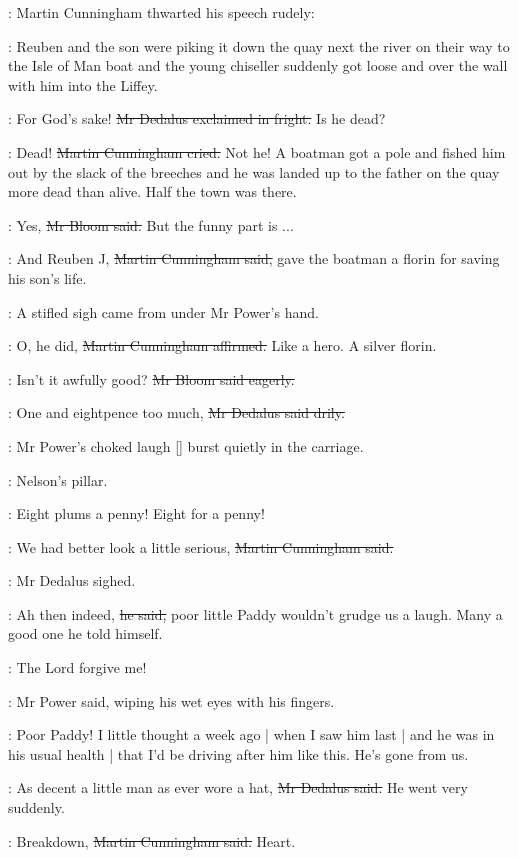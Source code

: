 :
Martin Cunningham thwarted his speech rudely:

\cunningham:
Reuben and the son were piking it down the quay next the river
on their way to the Isle of Man boat
and the young chiseller suddenly got loose
and over the wall with him
into the Liffey.

\simon:
For God's sake!
\sout{Mr Dedalus exclaimed in fright.}
Is he dead?

\cunningham:
Dead!
\sout{Martin Cunningham cried.}
Not he!
A boatman got a pole and fished him out by the slack of the breeches
and he was landed up to the father on the quay
more dead than alive.
Half the town was there.

\Bloom:
Yes,
\sout{Mr Bloom said.}
But the funny part is ...

\cunningham:
And Reuben J,
\sout{Martin Cunningham said,}
gave the boatman a florin for saving his son's life.

:
A stifled sigh came from under Mr Power's hand.

\cunningham:
O, he did,
\sout{Martin Cunningham affirmed.}
Like a hero.
A silver florin.

\Bloom:
Isn't it awfully good?
\sout{Mr Bloom said eagerly.}

\simon:
One and eightpence too much,
\sout{Mr Dedalus said drily.}

:
Mr Power's choked laugh
[]
burst quietly in the carriage.

\BloomInt:
Nelson's pillar.

\woman:
Eight plums a penny!
Eight for a penny!

\cunningham:
We had better look a little serious,
\sout{Martin Cunningham said.}

:
Mr Dedalus sighed.

\simon:
Ah then indeed,
\sout{he said,}
poor little Paddy wouldn't grudge us a laugh.
Many a good one he told himself.

\power:
The Lord forgive me!

:
Mr Power said,
wiping his wet eyes with his fingers.

\power:
Poor Paddy!
I little thought a week ago |
when I saw him last |
and he was in his usual health |
that I'd be driving after him like this.
He's gone from us.

\simon:
As decent a little man as ever wore a hat,
\sout{Mr Dedalus said.}
He went very suddenly.

\cunningham:
Breakdown,
\sout{Martin Cunningham said.}
Heart.

